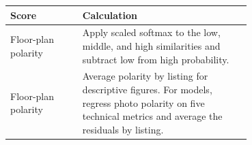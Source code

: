 \begin{tabular}{lp{0.70\linewidth}}
\toprule
Score & Calculation \\
\midrule
Floor-plan polarity & Apply scaled softmax to the low, middle, and high similarities and subtract low from high probability. \\
Floor-plan polarity & Average polarity by listing for descriptive figures. For models, regress photo polarity on five technical metrics and average the residuals by listing. \\
\bottomrule
\end{tabular}
